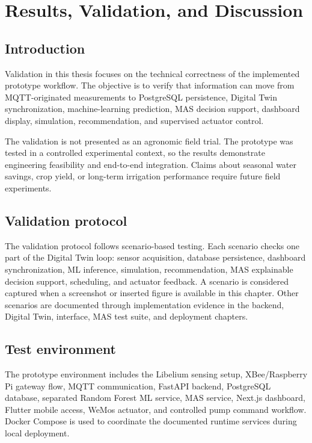 \chapter{Results, Validation, and Discussion}
\label{chap:results_validation}

\section{Introduction}

Validation in this thesis focuses on the technical correctness of the implemented prototype workflow. The objective is to verify that information can move from MQTT-originated measurements to PostgreSQL persistence, Digital Twin synchronization, machine-learning prediction, MAS decision support, dashboard display, simulation, recommendation, and supervised actuator control.

The validation is not presented as an agronomic field trial. The prototype was tested in a controlled experimental context, so the results demonstrate engineering feasibility and end-to-end integration. Claims about seasonal water savings, crop yield, or long-term irrigation performance require future field experiments.

\section{Validation protocol}

The validation protocol follows scenario-based testing. Each scenario checks one part of the Digital Twin loop: sensor acquisition, database persistence, dashboard synchronization, ML inference, simulation, recommendation, MAS explainable decision support, scheduling, and actuator feedback. A scenario is considered captured when a screenshot or inserted figure is available in this chapter. Other scenarios are documented through implementation evidence in the backend, Digital Twin, interface, MAS test suite, and deployment chapters.

\section{Test environment}

The prototype environment includes the Libelium sensing setup, XBee/Raspberry Pi gateway flow, MQTT communication, FastAPI backend, PostgreSQL database, separated Random Forest ML service, MAS service, Next.js dashboard, Flutter mobile access, WeMos actuator, and controlled pump command workflow. Docker Compose is used to coordinate the documented runtime services during local deployment.

